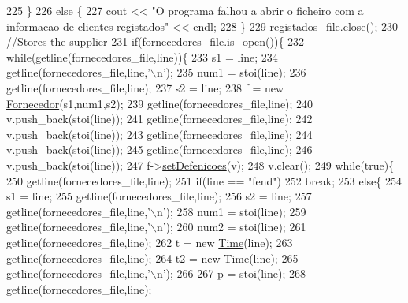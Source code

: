 \begin{DoxyCode}
225             \}
226         \textcolor{keywordflow}{else} \{
227             cout << \textcolor{stringliteral}{"O programa falhou a abrir o ficheiro com a informacao de clientes registados"} << endl;
228         \}
229     registados\_file.close();
230    \textcolor{comment}{//Stores the supplier}
231     \textcolor{keywordflow}{if}(fornecedores\_file.is\_open())\{
232             \textcolor{keywordflow}{while}(getline(fornecedores\_file,line))\{
233                 s1 = line;
234                 getline(fornecedores\_file,line,\textcolor{charliteral}{'\(\backslash\)n'});
235                 num1 = stoi(line);
236                 getline(fornecedores\_file,line);
237                 s2 = line;
238                 f = \textcolor{keyword}{new} \hyperlink{classFornecedor}{Fornecedor}(s1,num1,s2);
239                 getline(fornecedores\_file,line);
240                 v.push\_back(stoi(line));
241                 getline(fornecedores\_file,line);
242                 v.push\_back(stoi(line));
243                 getline(fornecedores\_file,line);
244                 v.push\_back(stoi(line));
245                 getline(fornecedores\_file,line);
246                 v.push\_back(stoi(line));
247                 f->\hyperlink{classFornecedor_a63bb5795c45d195995de437620503d98}{setDefenicoes}(v);
248                 v.clear();
249                 \textcolor{keywordflow}{while}(\textcolor{keyword}{true})\{
250                     getline(fornecedores\_file,line);
251                     \textcolor{keywordflow}{if}(line == \textcolor{stringliteral}{"fend"})
252                         \textcolor{keywordflow}{break};
253                     \textcolor{keywordflow}{else}\{
254                         s1 = line;
255                         getline(fornecedores\_file,line);
256                         s2 = line;
257                         getline(fornecedores\_file,line,\textcolor{charliteral}{'\(\backslash\)n'});
258                         num1 = stoi(line);
259                         getline(fornecedores\_file,line,\textcolor{charliteral}{'\(\backslash\)n'});
260                         num2 = stoi(line);
261                         getline(fornecedores\_file,line);
262                         t = \textcolor{keyword}{new} \hyperlink{classTime}{Time}(line);
263                         getline(fornecedores\_file,line);
264                         t2 = \textcolor{keyword}{new} \hyperlink{classTime}{Time}(line);
265                         getline(fornecedores\_file,line,\textcolor{charliteral}{'\(\backslash\)n'});
266 
267                         p = stoi(line);
268                         getline(fornecedores\_file,line);

\end{DoxyCode}
